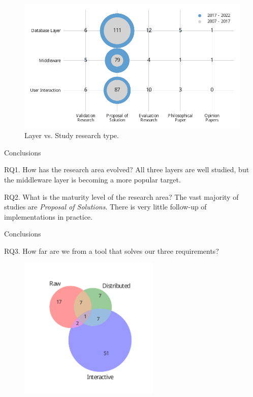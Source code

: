 \documentclass[10pt]{beamer}
\begin{document}
\begin{frame}{}
\begin{figure}
    \centering
    \includegraphics[width=\textwidth]{layer_vs_type.pdf}
    \caption{Layer vs. Study research type.}
\end{figure}
\end{frame}

\begin{frame}{Conclusions}
    \begin{block}{RQ1. How has the research area evolved?}
        \smallskip
        All three layers are well studied, but the middleware layer is becoming a more popular target.
    \end{block}
    \begin{block}{RQ2. What is the maturity level of the research area?}
        \smallskip
        The vast majority of studies are \emph{Proposal of Solutions}. There is very little follow-up of implementations in practice.
    \end{block}
\end{frame}

\begin{frame}{Conclusions}
    \begin{block}{RQ3. How far are we from a tool that solves our three requirements?}
        \begin{figure}
            \centering
            \includegraphics[width=0.6\textwidth]{venn.pdf}
        \end{figure}
    \end{block}
\end{frame}
\end{document}
